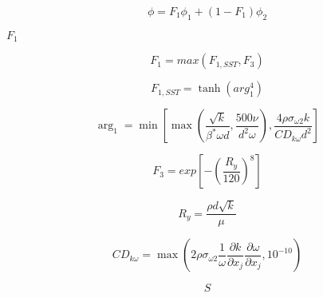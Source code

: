{\newpage\clearpage
{}%
\begin{displaymath}
\phi=F_{1} \phi_{1}+\left(1-F_{1}\right) \phi_{2}
\end{displaymath}%
\lthtmldisplayZ
\lthtmlcheckvsize\clearpage}

{\newpage\clearpage
{}%
$F_1$%
\lthtmlinlinemathZ
\lthtmlcheckvsize\clearpage}

{\newpage\clearpage
{}%
\begin{displaymath}
F_1 = max \left( F_{1,SST},F_3 \right)
\end{displaymath}%
\lthtmldisplayZ
\lthtmlcheckvsize\clearpage}

{\newpage\clearpage
{}%
\begin{displaymath}
F_{1,SST}=\tanh \left(a r g_{1}^{4}\right)
\end{displaymath}%
\lthtmldisplayZ
\lthtmlcheckvsize\clearpage}

{\newpage\clearpage
{}%
\begin{displaymath}
\arg _{1}=\min \left[\max \left(\frac{\sqrt{k}}{\beta^{*} \omega d}, \frac{500 \nu}{d^{2} \omega}\right), \frac{4 \rho \sigma_{\omega 2} k}{C D_{k \omega} d^{2}}\right]
\end{displaymath}%
\lthtmldisplayZ
\lthtmlcheckvsize\clearpage}

{\newpage\clearpage
{}%
\begin{displaymath}
F_3 = exp \left[ - \left( \frac{R_y}{120} \right)^8 \right]
\end{displaymath}%
\lthtmldisplayZ
\lthtmlcheckvsize\clearpage}

{\newpage\clearpage
{}%
\begin{displaymath}
  R_y = \frac{\rho d \sqrt{k}}{\mu}
\end{displaymath}%
\lthtmldisplayZ
\lthtmlcheckvsize\clearpage}

{\newpage\clearpage
{}%
\begin{displaymath}
C D_{k \omega}=\max \left(2 \rho \sigma_{\omega 2} \frac{1}{\omega} \frac{\partial k}{\partial x_{j}} \frac{\partial \omega}{\partial x_{j}}, 10^{-10}\right)
\end{displaymath}%
\lthtmldisplayZ
\lthtmlcheckvsize\clearpage}

{\newpage\clearpage
{}%
\begin{displaymath}
S
\end{displaymath}%
\lthtmldisplayZ
\lthtmlcheckvsize\clearpage}

